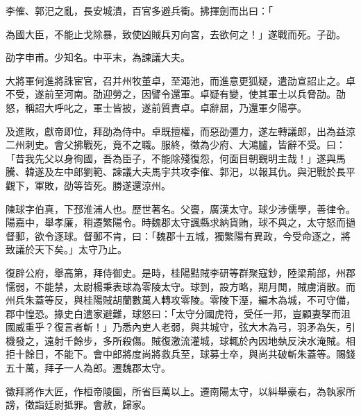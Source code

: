 \begin{pinyinscope}
李傕、郭汜之亂，長安城潰，百官多避兵衝。拂揮劍而出曰：「

為國大臣，不能止戈除暴，致使凶賊兵刃向宮，去欲何之！」遂戰而死。子劭。

劭字申甫。少知名。中平末，為諫議大夫。

大將軍何進將誅宦官，召并州牧董卓，至澠池，而進意更狐疑，遣劭宣詔止之。卓不受，遂前至河南。劭迎勞之，因譬令還軍。卓疑有變，使其軍士以兵脅劭。劭怒，稱詔大呼叱之，軍士皆披，遂前質責卓。卓辭屈，乃還軍夕陽亭。

及進敗，獻帝即位，拜劭為侍中。卓既擅權，而惡劭彊力，遂左轉議郎，出為益涼二州刺史。會父拂戰死，竟不之職。服終，徵為少府、大鴻臚，皆辭不受。曰：「昔我先父以身徇國，吾為臣子，不能除殘復怨，何面目朝覲明主哉！」遂與馬騰、韓遂及左中郎劉範、諫議大夫馬宇共攻李傕、郭汜，以報其仇。與汜戰於長平觀下，軍敗，劭等皆死。勝遂還涼州。

陳球字伯真，下邳淮浦人也。歷世著名。父亹，廣漢太守。球少涉儒學，善律令。陽嘉中，舉孝廉，稍遷繁陽令。時魏郡太守諷縣求納貨賄，球不與之，太守怒而撾督郵，欲令逐球。督郵不肯，曰：「魏郡十五城，獨繁陽有異政，今受命逐之，將致議於天下矣。」太守乃止。

復辟公府，舉高第，拜侍御史。是時，桂陽黠賊李研等群聚寇鈔，陸梁荊部，州郡懦弱，不能禁，太尉楊秉表球為零陵太守。球到，設方略，期月閒，賊虜消散。而州兵朱蓋等反，與桂陽賊胡蘭數萬人轉攻零陵。零陵下溼，編木為城，不可守備，郡中惶恐。掾史白遣家避難，球怒曰：「太守分國虎符，受任一邦，豈顧妻孥而沮國威重乎？復言者斬！」乃悉內吏人老弱，與共城守，弦大木為弓，羽矛為矢，引機發之，遠射千餘步，多所殺傷。賊復激流灌城，球輒於內因地埶反決水淹賊。相拒十餘日，不能下。會中郎將度尚將救兵至，球募士卒，與尚共破斬朱蓋等。賜錢五十萬，拜子一人為郎。遷魏郡太守。

徵拜將作大匠，作桓帝陵園，所省巨萬以上。遷南陽太守，以糾舉豪右，為執家所謗，徵詣廷尉抵罪。會赦，歸家。


\end{pinyinscope}
